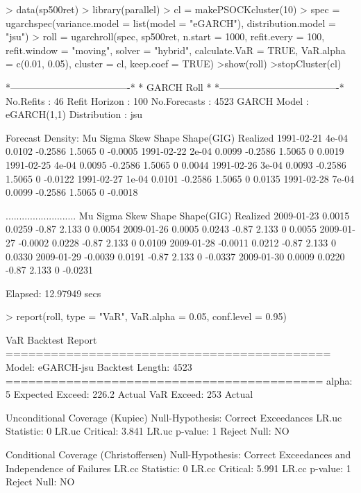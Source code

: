 \begin{Schunk}
\begin{Sinput}
> data(sp500ret)
> library(parallel)
> cl = makePSOCKcluster(10)
> spec = ugarchspec(variance.model = list(model = "eGARCH"), distribution.model = "jsu")
> roll = ugarchroll(spec, sp500ret, n.start = 1000, refit.every = 100,
refit.window = "moving", solver = "hybrid", calculate.VaR = TRUE,
VaR.alpha = c(0.01, 0.05), cluster = cl, keep.coef = TRUE)
>show(roll)
>stopCluster(cl)
\end{Sinput}
\begin{Soutput}
*-------------------------------------*
*              GARCH Roll             *
*-------------------------------------*
No.Refits       : 46
Refit Horizon   : 100
No.Forecasts    : 4523
GARCH Model     : eGARCH(1,1)
Distribution    : jsu

Forecast Density:
              Mu  Sigma    Skew  Shape Shape(GIG) Realized
1991-02-21 4e-04 0.0102 -0.2586 1.5065          0  -0.0005
1991-02-22 2e-04 0.0099 -0.2586 1.5065          0   0.0019
1991-02-25 4e-04 0.0095 -0.2586 1.5065          0   0.0044
1991-02-26 3e-04 0.0093 -0.2586 1.5065          0  -0.0122
1991-02-27 1e-04 0.0101 -0.2586 1.5065          0   0.0135
1991-02-28 7e-04 0.0099 -0.2586 1.5065          0  -0.0018

..........................
                Mu  Sigma  Skew Shape Shape(GIG) Realized
2009-01-23  0.0015 0.0259 -0.87 2.133          0   0.0054
2009-01-26  0.0005 0.0243 -0.87 2.133          0   0.0055
2009-01-27 -0.0002 0.0228 -0.87 2.133          0   0.0109
2009-01-28 -0.0011 0.0212 -0.87 2.133          0   0.0330
2009-01-29 -0.0039 0.0191 -0.87 2.133          0  -0.0337
2009-01-30  0.0009 0.0220 -0.87 2.133          0  -0.0231

Elapsed: 12.97949 secs
\end{Soutput}
\begin{Sinput}
> report(roll, type = "VaR", VaR.alpha = 0.05, conf.level = 0.95)
\end{Sinput}
\begin{Soutput}
VaR Backtest Report
===========================================
Model:                  eGARCH-jsu
Backtest Length:        4523
==========================================
alpha:                  5%
Expected Exceed:        226.2
Actual VaR Exceed:      253
Actual %

Unconditional Coverage (Kupiec)
Null-Hypothesis:        Correct Exceedances
LR.uc Statistic:        0
LR.uc Critical:         3.841
LR.uc p-value:          1
Reject Null:            NO

Conditional Coverage (Christoffersen)
Null-Hypothesis:        Correct Exceedances and
                        Independence of Failures
LR.cc Statistic:        0
LR.cc Critical:         5.991
LR.cc p-value:          1
Reject Null:            NO
\end{Soutput}
\end{Schunk}
